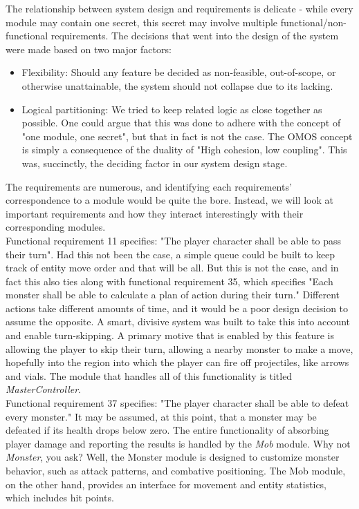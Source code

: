 \documentclass[12pt, titlepage]{article}
\begin{document}
    The relationship between system design and requirements is delicate - while every module may contain one secret, this secret may involve multiple functional/non-functional requirements. The decisions that went into the design of the system were made based on two major factors:

    \begin{itemize}
        \item Flexibility: Should any feature be decided as non-feasible, out-of-scope, or otherwise unattainable, the system should not collapse due to its lacking.
        \item Logical partitioning: We tried to keep related logic as close together as possible. One could argue that this was done to adhere with the concept of "one module, one secret", but that in fact is not the case. The OMOS concept is simply a consequence of the duality of "High cohesion, low coupling". This was, succinctly, the deciding factor in our system design stage.
    \end{itemize}

    The requirements are numerous, and identifying each requirements' correspondence to a module would be quite the bore. Instead, we will look at important requirements and how they interact interestingly with their corresponding modules.\\

    Functional requirement 11 specifies: "The player character shall be able to pass their turn". Had this not been the case, a simple queue could be built to keep track of entity move order and that will be all. But this is not the case, and in fact this also ties along with functional requirement 35, which specifies "Each monster shall be able to calculate a plan of action during their turn." Different actions take different amounts of time, and it would be a poor design decision to assume the opposite. A smart, divisive system was built to take this into account and enable turn-skipping. A primary motive that is enabled by this feature is allowing the player to skip their turn, allowing a nearby monster to make a move, hopefully into the region into which the player can fire off projectiles, like arrows and vials. The module that handles all of this functionality is titled \textit{MasterController}.\\

    Functional requirement 37 specifies: "The player character shall be able to defeat every monster." It may be assumed, at this point, that a monster may be defeated if its health drops below zero. The entire functionality of absorbing player damage and reporting the results is handled by the \textit{Mob} module. Why not \textit{Monster}, you ask? Well, the Monster module is designed to customize monster behavior, such as attack patterns, and combative positioning. The Mob module, on the other hand, provides an interface for movement and entity statistics, which includes hit points.\\
\end{document}
